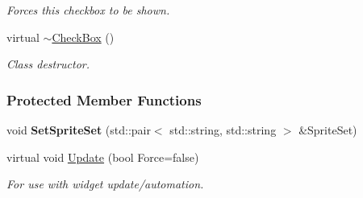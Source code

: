 \begin{DoxyCompactItemize}
\begin{DoxyCompactList}\small\item\em Forces this checkbox to be shown. \item\end{DoxyCompactList}\item 
\hypertarget{classphys_1_1UI_1_1CheckBox_a60c4d62c357a7158d69888a367b5dc56}{
virtual \hyperlink{classphys_1_1UI_1_1CheckBox_a60c4d62c357a7158d69888a367b5dc56}{$\sim$CheckBox} ()}
\label{classphys_1_1UI_1_1CheckBox_a60c4d62c357a7158d69888a367b5dc56}

\begin{DoxyCompactList}\small\item\em Class destructor. \item\end{DoxyCompactList}\end{DoxyCompactItemize}
\subsubsection*{Protected Member Functions}
\begin{DoxyCompactItemize}
\item 
\hypertarget{classphys_1_1UI_1_1CheckBox_ac20138946e42c608ac0808fc40fce4ce}{
void {\bfseries SetSpriteSet} (std::pair$<$ std::string, std::string $>$ \&SpriteSet)}
\label{classphys_1_1UI_1_1CheckBox_ac20138946e42c608ac0808fc40fce4ce}

\item 
\hypertarget{classphys_1_1UI_1_1CheckBox_ad988ce71809fd1dea6def42da50232eb}{
virtual void \hyperlink{classphys_1_1UI_1_1CheckBox_ad988ce71809fd1dea6def42da50232eb}{Update} (bool Force=false)}
\label{classphys_1_1UI_1_1CheckBox_ad988ce71809fd1dea6def42da50232eb}

\begin{DoxyCompactList}\small\item\em For use with widget update/automation. \item\end{DoxyCompactList}\end{DoxyCompactItemize}
